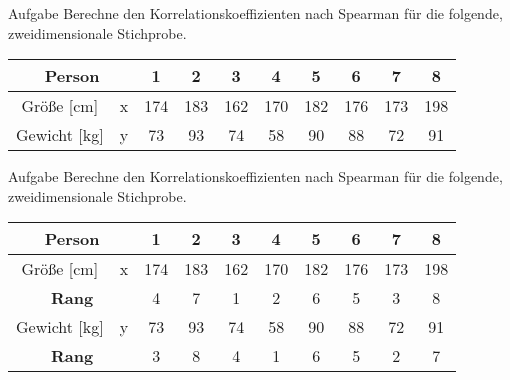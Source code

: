 \documentclass[t,11pt]{beamer}
\begin{document}
	\author{www.oilbat.de}
	\subtitle{}
	\logo{}
	\institute{}
	\date{}
	\subject{}

\addtocounter{framenumber}{-1}

\begin{frame}
	\begin{block}{Aufgabe}
		Berechne den Korrelationskoeffizienten nach Spearman für die folgende, zweidimensionale Stichprobe.
	\end{block}
	\vspace{0.5cm}
	\begin{tabular}{|cc|cccccccc|}
		\hline
		\multicolumn{2}{|c|}{Person} & 1 & 2 & 3 & 4 & 5 & 6 & 7 & 8 \\
		\hline 
		Größe [cm] & x & 174 & 183 & 162  & 170 & 182 & 176 & 173 & 198  \\ 
		Gewicht [kg] & y &  73 & 93 & 74 & 58 & 90 & 88 & 72 & 91\\ 
		\hline 
	\end{tabular}

\end{frame}

\begin{frame}
\begin{block}{Aufgabe}
	Berechne den Korrelationskoeffizienten nach Spearman für die folgende, zweidimensionale Stichprobe.
\end{block}
\vspace{0.5cm}
\begin{tabular}{|cc|cccccccc|}
	\hline
	\multicolumn{2}{|c|}{Person} & 1 & 2 & 3 & 4 & 5 & 6 & 7 & 8 \\
	\hline 
	Größe [cm] & x & 174 & 183 & 162  & 170 & 182 & 176 & 173 & 198  \\ 
	\multicolumn{2}{|c|}{\textbf{Rang}} & 4 & 7 & 1 & 2 & 6 & 5 & 3 & 8 \\
	\hline
	Gewicht [kg] & y &  73 & 93 & 74 & 58 & 90 & 88 & 72 & 91\\ 
	\multicolumn{2}{|c|}{\textbf{Rang}} & 3 & 8 & 4 & 1 & 6 & 5 & 2 & 7 \\
	\hline 
\end{tabular}

\end{frame}
\end{document}
